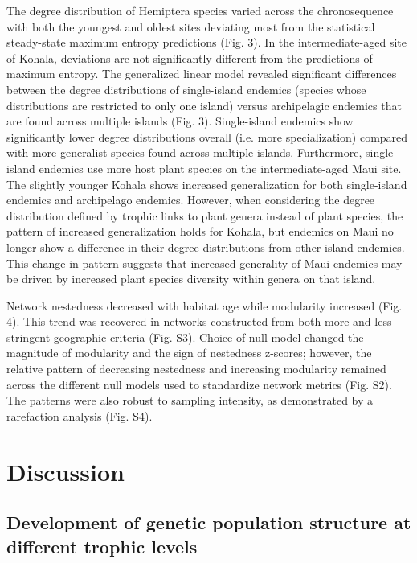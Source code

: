 The degree distribution of Hemiptera species varied across the
chronosequence with both the youngest and oldest sites deviating most
from the statistical steady-state maximum entropy predictions
(Fig. 3). In the intermediate-aged site of Kohala, deviations are not
significantly different from the predictions of maximum entropy.  The
generalized linear model revealed significant differences between the
degree distributions of single-island endemics (species whose
distributions are restricted to only one island) versus archipelagic
endemics that are found across multiple islands
(Fig. 3). Single-island endemics show significantly lower degree
distributions overall (i.e. more specialization) compared with more
generalist species found across multiple islands. Furthermore,
single-island endemics use more host plant species on the
intermediate-aged Maui site. The slightly younger Kohala shows
increased generalization for both single-island endemics and
archipelago endemics. However, when considering the degree
distribution defined by trophic links to plant genera instead of plant
species, the pattern of increased generalization holds for Kohala, but
endemics on Maui no longer show a difference in their degree
distributions from other island endemics. This change in pattern
suggests that increased generality of Maui endemics may be driven by
increased plant species diversity within genera on that island.

Network nestedness decreased with habitat age while modularity
increased (Fig. 4). This trend was recovered in networks constructed
from both more and less stringent geographic criteria
(Fig. S3). Choice of null model changed the magnitude of modularity
and the sign of nestedness z-scores; however, the relative pattern of
decreasing nestedness and increasing modularity remained across the
different null models used to standardize network metrics
(Fig. S2). The patterns were also robust to sampling intensity, as
demonstrated by a rarefaction analysis (Fig. S4).


\section{Discussion}

\subsection{Development of genetic population structure at different
trophic levels}

